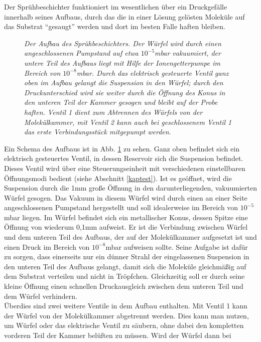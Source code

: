 Der Sprühbeschichter funktioniert im wesentlichen über ein Druckgefälle innerhalb seines Aufbaus, durch das
die in einer Lösung gelösten Moleküle auf das Substrat "`gesaugt"' werden und dort im besten
Falle haften bleiben. 
\begin{figure}
\centering
\sffamily

\caption{\textit{Der Aufbau des Sprühbeschichters.
Der Würfel wird durch einen angeschlossenen Pumpstand auf etwa $10^{-5}$mbar vakuumiert, der untere
Teil des Aufbaus liegt mit Hilfe der Ionengetterpumpe im Bereich von $10^{-8}$mbar. Durch das
elektrisch gesteuerte Ventil ganz oben im Aufbau gelangt die Suspension in den Würfel; durch den
Druckunterschied wird sie weiter durch die Öffnung des Konus in den unteren Teil der Kammer gesogen
und bleibt auf der Probe haften. Ventil 1 dient zum Abtrennen des Würfels von der Molekülkammer, mit
Ventil 2 kann auch bei geschlossenem Ventil 1 das erste Verbindungsstück mitgepumpt werden.
}}
\label{sbaufbau}
\end{figure}
Ein Schema des Aufbaus ist in Abb. \ref{sbaufbau} zu sehen. Ganz oben befindet sich ein elektrisch
gesteuertes Ventil, in dessen Reservoir sich die Suspension befindet. Dieses Ventil wird über eine
Steuerungseinheit mit verschiedenen einstellbaren Öffnungsmodi bedient (siehe Abschnitt \ref{kaptest}). Ist es
geöffnet, wird die Suspension durch die 1mm große Öffnung in den darunterliegenden, vakuumierten Würfel
gesogen. Das Vakuum in diesem Würfel wird durch einen an einer Seite angeschlossenen Pumpstand hergestellt
und soll idealerweise im Bereich von $10^{-5}$mbar liegen. Im Würfel befindet sich ein metallischer
Konus, dessen Spitze eine Öffnung von wiederum 0,1mm aufweist. Er ist die Verbindung zwischen Würfel und dem
unteren Teil des Aufbaus, der auf der Molekülkammer aufgesetzt ist und einen Druck im Bereich von
$10^{-8}$mbar aufweisen sollte.  
Seine Aufgabe ist dafür zu sorgen, dass einerseits nur ein dünner Strahl der eingelassenen Suspension in
den unteren Teil des Aufbaus gelangt, damit sich die Moleküle gleichmäßig auf dem Substrat verteilen und
nicht in Tröpfchen. Gleichzeitig soll er durch seine kleine Öffnung einen schnellen Druckausgleich zwischen
dem unteren Teil und dem Würfel verhindern. \\
Überdies sind zwei weitere Ventile in dem Aufbau enthalten. Mit Ventil 1 kann der Würfel von der
Molekülkammer abgetrennt werden. Dies kann man nutzen, um Würfel oder das elektrische Ventil zu säubern, ohne
dabei den kompletten vorderen Teil der Kammer belüften zu müssen. Wird der Würfel dann bei
